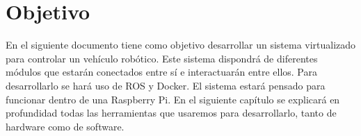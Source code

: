 \chapter{Objetivo}
En el siguiente documento tiene como objetivo desarrollar un sistema virtualizado para controlar un vehículo robótico. Este sistema dispondrá de diferentes módulos que estarán conectados entre sí e interactuarán entre ellos. Para desarrollarlo se hará uso de ROS y Docker. El sistema estará pensado para funcionar dentro de una Raspberry Pi. En el siguiente capítulo se explicará en profundidad todas las herramientas que usaremos para desarrollarlo, tanto de hardware como de software.